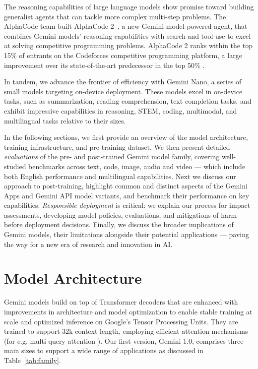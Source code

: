 The reasoning capabilities of large language models show promise toward building generalist agents that can tackle more complex multi-step problems. The AlphaCode team built AlphaCode 2~\citep{gdm2023alphacode2}, a new Gemini-model-powered agent, that combines Gemini models' reasoning capabilities with search and tool-use to excel at solving competitive programming problems. AlphaCode 2 ranks within the top 15\% of entrants on the Codeforces competitive programming platform, a large improvement over its state-of-the-art predecessor in the top 50\% \citep{alphacode}. 

In tandem, we advance the frontier of efficiency with Gemini Nano, a series of small models targeting on-device deployment. These models excel in on-device tasks, such as summarization, reading comprehension, text completion tasks, and exhibit impressive capabilities in reasoning, STEM, coding, multimodal, and multilingual tasks relative to their sizes. 

In the following sections, we first provide an overview of the model architecture, training infrastructure, and pre-training dataset. We then present detailed \textit{evaluations} of the pre- and post-trained Gemini model family, covering well-studied benchmarks across text, code, image, audio and video --- which include both English performance and multilingual capabilities.  Next we discuss our approach to post-training, highlight common and distinct aspects of the Gemini Apps and Gemini API model variants, and benchmark their performance on key capabilities. \textit{Responsible deployment} is critical: we explain our process for impact assessments, developing model policies, evaluations, and mitigations of harm before deployment decisions. Finally, we discuss the broader implications of Gemini models, their limitations alongside their potential applications --- paving the way for a new era of research and innovation in AI. 

\section{Model Architecture}
\label{sec:arch}

Gemini models build on top of Transformer decoders \citep{vaswani2017} that are enhanced with improvements in architecture and model optimization to enable stable training at scale and optimized inference on Google's Tensor Processing Units. They are trained to support 32k context length, employing efficient attention mechanisms (for e.g. multi-query attention \citep{mqa}). Our first version, Gemini 1.0, comprises three main sizes to support a wide range of applications as discussed in Table~\ref{tab:family}.

